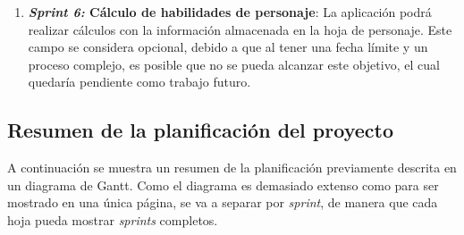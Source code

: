\begin{enumerate}
    \item \textbf{\textit{Sprint 6:} Cálculo de habilidades de personaje}: La aplicación podrá realizar 
    cálculos con la información almacenada en la hoja de personaje. Este campo se considera opcional, debido a que 
    al tener una fecha límite y un proceso complejo, es posible que no se pueda alcanzar este objetivo, el cual quedaría 
    pendiente como trabajo futuro.

\end{enumerate}

\subsection{Resumen de la planificación del proyecto}
A continuación se muestra un resumen de la planificación previamente descrita en un diagrama de Gantt. 
Como el diagrama es demasiado extenso como para ser mostrado en una única página, se va a separar 
por \textit{sprint}, de manera que cada hoja pueda mostrar \textit{sprints} completos.







